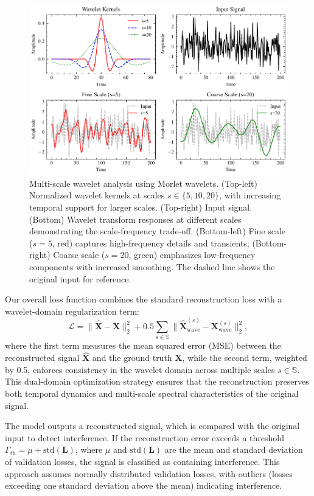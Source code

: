 \documentclass[conference]{IEEEtran}
\begin{document}
\begin{figure}[tbp]
    \centering
    \includegraphics[width=\linewidth]{wavelet-transform.pdf}
    \caption{Multi-scale wavelet analysis using Morlet wavelets. (Top-left) Normalized wavelet kernels at scales $s \in \{5, 10, 20\}$, with increasing temporal support for larger scales. (Top-right) Input signal. (Bottom) Wavelet transform responses at different scales demonstrating the scale-frequency trade-off: (Bottom-left) Fine scale ($s=5$, red) captures high-frequency details and transients; (Bottom-right) Coarse scale ($s=20$, green) emphasizes low-frequency components with increased smoothing. The dashed line shows the original input for reference.}
    \label{fig:wavelet-transform}
\end{figure}

Our overall loss function combines the standard reconstruction loss with a wavelet-domain regularization term:
\begin{equation}
    \mathcal{L} = \|\mathbf{\hat{X}} - \mathbf{X}\|_2^2 + 0.5\sum_{s\in\mathbb{S}} \|\mathbf{\hat{X}}_{\text{wave}}^{(s)} - \mathbf{X}_{\text{wave}}^{(s)}\|_2^2,
\end{equation}
where the first term measures the mean squared error (MSE) between the reconstructed signal $\mathbf{\hat{X}}$ and the ground truth $\mathbf{X}$, while the second term, weighted by 0.5, enforces consistency in the wavelet domain across multiple scales $s \in \mathbb{S}$. This dual-domain optimization strategy ensures that the reconstruction preserves both temporal dynamics and multi-scale spectral characteristics of the original signal.

The model outputs a reconstructed signal, which is compared with the original input to detect interference. If the reconstruction error exceeds a threshold $\Gamma_{\text{th}} = \mu + \text{std}(\mathbf{L})$, where $\mu$ and $\text{std}(\mathbf{L})$ are the mean and standard deviation of validation losses, the signal is classified as containing interference. This approach assumes normally distributed validation losses, with outliers (losses exceeding one standard deviation above the mean) indicating interference.
\end{document}

